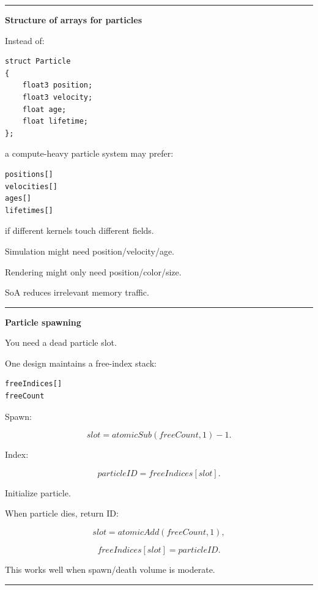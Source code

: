 \begin{center}\rule{0.5\linewidth}{0.5pt}\end{center}

\textbf{Structure of arrays for particles}

Instead of:

\protect{}\label{p10-particle-aos}%
\begin{verbatim}
struct Particle
{
    float3 position;
    float3 velocity;
    float age;
    float lifetime;
};
\end{verbatim}

a compute-heavy particle system may prefer:

\protect{}\label{p10-particle-soa}%
\begin{verbatim}
positions[]
velocities[]
ages[]
lifetimes[]
\end{verbatim}

if different kernels touch different fields.

Simulation might need position/velocity/age.

Rendering might only need position/color/size.

SoA reduces irrelevant memory traffic.

\begin{center}\rule{0.5\linewidth}{0.5pt}\end{center}

\textbf{Particle spawning}

You need a dead particle slot.

One design maintains a free-index stack:

\protect{}\label{p10-free-list}%
\begin{verbatim}
freeIndices[]
freeCount
\end{verbatim}

Spawn:

\[
slot=
atomicSub(freeCount,1)-1.
\]

Index:

\[
particleID=
freeIndices[slot].
\]

Initialize particle.

When particle dies, return ID:

\[
slot=
atomicAdd(freeCount,1),
\]

\[
freeIndices[slot]=particleID.
\]

This works well when spawn/death volume is moderate.

\begin{center}\rule{0.5\linewidth}{0.5pt}\end{center}

